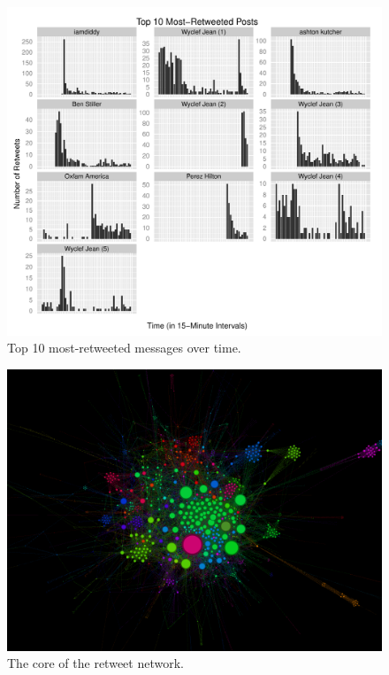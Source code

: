\documentclass[a4paper, 11pt, titlepage]{article}
\begin{document}
\begin{figure}[h]
\centering
\label{fig:rt_top_10}
\includegraphics[width=120mm]{../figures/rt_top_10_over_time_free_scale}
\caption{Top 10 most-retweeted messages over time.}
\end{figure}

\begin{figure}[h]
\centering
\label{fig:rt_net_core}
\includegraphics[width=120mm]{../figures/rt_net_core}
\caption{The core of the retweet network.}
\end{figure}
\end{document}
